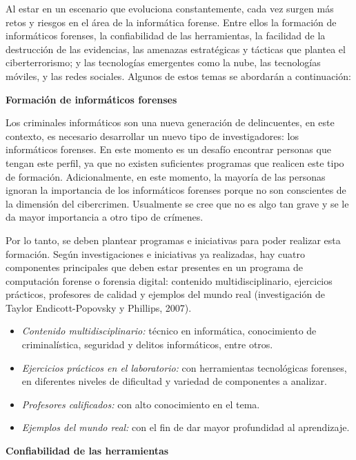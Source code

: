 Al estar en un escenario que evoluciona constantemente, cada vez surgen más retos y riesgos en el área de la informática forense. Entre ellos la formación de informáticos forenses, la confiabilidad de las herramientas, la facilidad de la destrucción de las evidencias, las amenazas estratégicas y tácticas que plantea el ciberterrorismo; y las tecnologías emergentes como la nube, las tecnologías móviles, y las redes sociales. Algunos de estos temas se abordarán a continuación:

\textbf{Formación de informáticos forenses}

Los criminales informáticos son una nueva generación de delincuentes, en este contexto, es necesario desarrollar un nuevo tipo de investigadores: los informáticos forenses. En este momento es un desafío encontrar personas que tengan este perfil, ya que no existen suficientes programas que realicen este tipo de formación. Adicionalmente, en este momento, la mayoría de las personas ignoran la importancia de los informáticos forenses porque no son conscientes de la dimensión del cibercrimen. Usualmente se cree que no es algo tan grave y se le da mayor importancia a otro tipo de crímenes.

Por lo tanto, se deben plantear programas e iniciativas para poder realizar esta formación. Según investigaciones e iniciativas ya realizadas, hay cuatro componentes principales que deben estar presentes en un programa de computación forense o forensia digital: contenido multidisciplinario, ejercicios prácticos, profesores de calidad y ejemplos del mundo real (investigación de Taylor Endicott-Popovsky y Phillips, 2007).

\begin{itemize}
    \item \emph{Contenido multidisciplinario:} técnico en informática, conocimiento de criminalística, seguridad y delitos informáticos, entre otros.
    \item \emph{Ejercicios prácticos en el laboratorio:} con herramientas tecnológicas forenses, en diferentes niveles de dificultad y variedad de componentes a analizar.
    \item \emph{Profesores calificados:} con alto conocimiento en el tema.
    \item \emph{Ejemplos del mundo real:} con el fin de dar mayor profundidad al aprendizaje.
\end{itemize}



\textbf{Confiabilidad de las herramientas}

